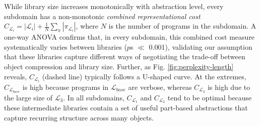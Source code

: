 \documentclass[10pt,letterpaper]{article}
\begin{document}
While library size increases monotonically with abstraction level, every subdomain has a non-monotonic \textit{combined representational cost} $C_{\mathcal{L}_i} = |\mathcal{L}_i| + \frac{1}{N} \sum_{\pi} |\pi_{\mathcal{L}_i}|$, where $N$ is the number of programs in the subdomain. 
A one-way ANOVA confirms that, in every subdomain, this combined cost measure systematically varies between libraries ($p$s $\ll$ 0.001), validating our assumption that these libraries capture different ways of negotiating the trade-off between object compression and library size. 
Further, as Fig. \ref{fig:perplexity-length} reveals, $C_{\mathcal{L}_i}$ (dashed line) typically follows a U-shaped curve. 
At the extremes, $C_{\mathcal{L}_{base}}$ is high because programs in $\mathcal{L}_{base}$ are verbose, whereas $C_{\mathcal{L}_3}$ is high due to the large size of ${\mathcal{L}_3}$. In all subdomains, $C_{\mathcal{L}_1}$ and $C_{\mathcal{L}_2}$ tend to be optimal because these intermediate libraries contain a set of useful part-based abstractions that capture recurring structure across many objects. 


\end{document}
